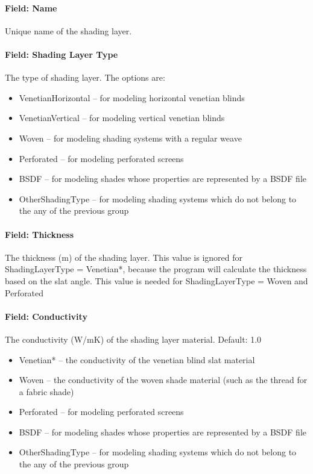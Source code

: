 \paragraph{Field: Name}\label{field-name-18-007}

Unique name of the shading layer.

\paragraph{Field: Shading Layer Type}\label{field-shading-layer-type}

The type of shading layer. The options are:

\begin{itemize}
\item
  VenetianHorizontal -- for modeling horizontal venetian blinds
\item
  VenetianVertical -- for modeling vertical venetian blinds
\item
  Woven -- for modeling shading systems with a regular weave
\item
  Perforated -- for modeling perforated screens
\item
  BSDF -- for modeling shades whose properties are represented by a BSDF file
\item
  OtherShadingType -- for modeling shading systems which do not belong to the any of the previous group
\end{itemize}

\paragraph{Field: Thickness}\label{field-thickness-7}

The thickness (m) of the shading layer. This value is ignored for ShadingLayerType = Venetian*, because the program will calculate the thickness based on the slat angle. This value is needed for ShadingLayerType = Woven and Perforated

\paragraph{Field: Conductivity}\label{field-conductivity-4}

The conductivity (W/mK) of the shading layer material. Default: 1.0

\begin{itemize}
\item
  Venetian* -- the conductivity of the venetian blind slat material
\item
  Woven -- the conductivity of the woven shade material (such as the thread for a fabric shade)
\item
  Perforated -- for modeling perforated screens
\item
  BSDF -- for modeling shades whose properties are represented by a BSDF file
\item
  OtherShadingType -- for modeling shading systems which do not belong to the any of the previous group
\end{itemize}

